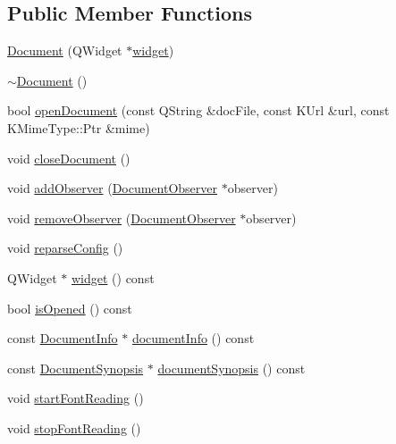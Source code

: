 \subsection*{Public Member Functions}
\begin{DoxyCompactItemize}
\item 
\hyperlink{classOkular_1_1Document_ab57646ba1264ec50ae484ffb7ff1f95e}{Document} (Q\+Widget $\ast$\hyperlink{classOkular_1_1Document_aef26598eca4c2fe772cc77d7730a9e8b}{widget})
\item 
\hyperlink{classOkular_1_1Document_ac2e3f62307dc22baac21ddc10fa1609c}{$\sim$\+Document} ()
\item 
bool \hyperlink{classOkular_1_1Document_aaec42a1303846888ea6d3151d2be2c3e}{open\+Document} (const Q\+String \&doc\+File, const K\+Url \&url, const K\+Mime\+Type\+::\+Ptr \&mime)
\item 
void \hyperlink{classOkular_1_1Document_ac0560562cba36a50717125b4aaeea7b7}{close\+Document} ()
\item 
void \hyperlink{classOkular_1_1Document_a37300860cf93f60184305829b033e0e2}{add\+Observer} (\hyperlink{classOkular_1_1DocumentObserver}{Document\+Observer} $\ast$observer)
\item 
void \hyperlink{classOkular_1_1Document_a2d704dea2ab28c846e58443ac38841f2}{remove\+Observer} (\hyperlink{classOkular_1_1DocumentObserver}{Document\+Observer} $\ast$observer)
\item 
void \hyperlink{classOkular_1_1Document_aa866452da62472e6b52ef395da8d4d9c}{reparse\+Config} ()
\item 
Q\+Widget $\ast$ \hyperlink{classOkular_1_1Document_aef26598eca4c2fe772cc77d7730a9e8b}{widget} () const 
\item 
bool \hyperlink{classOkular_1_1Document_a909ad69d556a6525e194a28c7fbf643a}{is\+Opened} () const 
\item 
const \hyperlink{classOkular_1_1DocumentInfo}{Document\+Info} $\ast$ \hyperlink{classOkular_1_1Document_a9c0b854496aa923bd575593a299af7e4}{document\+Info} () const 
\item 
const \hyperlink{classOkular_1_1DocumentSynopsis}{Document\+Synopsis} $\ast$ \hyperlink{classOkular_1_1Document_aa9dad88fffd255f0a1112228f58512f2}{document\+Synopsis} () const 
\item 
void \hyperlink{classOkular_1_1Document_af003edc174db0e3e80cdf7b138e3a246}{start\+Font\+Reading} ()
\item 
void \hyperlink{classOkular_1_1Document_a25f2f47f51c226d137a914d168ac5e1b}{stop\+Font\+Reading} ()
\item 

\end{DoxyCompactItemize}
